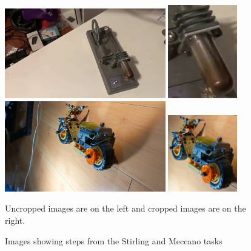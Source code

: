 \begin{figure}
  \includegraphics[width=7cm]{figures/stirling/uncropped.png}
  \includegraphics[width=3cm, left]{figures/stirling/cropped.png}
  \includegraphics[width=7cm]{figures/erector/uncropped.png}
  \includegraphics[width=3cm]{figures/erector/cropped.png}
  \begin{captiontext}
    Uncropped images are on the left and cropped images are on the right.
  \end{captiontext}
  \caption{
    Images showing steps from the Stirling and Meccano tasks
  }\label{fig:cropped_uncropped}
\end{figure}


